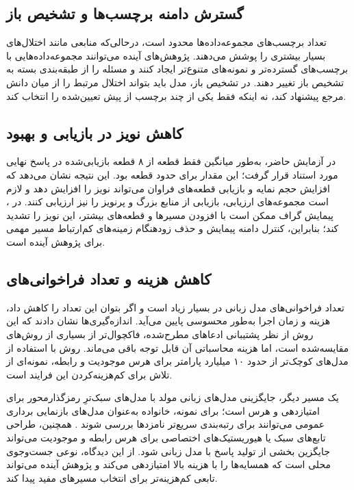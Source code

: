 \subsection{گسترش دامنه برچسب‌ها و تشخیص باز}

تعداد برچسب‌های مجموعه‌داده‌ها محدود است، درحالی‌که منابعی مانند  اختلال‌های بسیار بیشتری را پوشش می‌دهند. پژوهش‌های آینده می‌توانند مجموعه‌داده‌هایی با برچسب‌های گسترده‌تر و نمونه‌های متنوع‌تر ایجاد کنند و مسئله را از طبقه‌بندی بسته به تشخیص باز تغییر دهند. در تشخیص باز، مدل باید بتواند اختلال مرتبط را از میان دانش مرجع پیشنهاد کند، نه اینکه فقط یکی از چند برچسب از پیش تعیین‌شده را انتخاب کند.

\subsection{کاهش نویز در بازیابی و بهبود }

در آزمایش حاضر، به‌طور میانگین فقط  قطعه از ۸ قطعه بازیابی‌شده در پاسخ نهایی  مورد استناد قرار گرفت؛ این مقدار برای  حدود  قطعه بود. این نتیجه نشان می‌دهد که افزایش حجم نمایه و بازیابی قطعه‌های فراوان می‌تواند نویز را افزایش دهد و لازم است مجموعه‌های ارزیابی، بازیابی از منابع بزرگ و پرنویز را نیز ارزیابی کنند. در ، پیمایش گراف ممکن است با افزودن مسیرها و قطعه‌های بیشتر، این نویز را تشدید کند؛ بنابراین، کنترل دامنه پیمایش و حذف زودهنگام زمینه‌های کم‌ارتباط مسیر مهمی برای پژوهش آینده است.

\subsection{کاهش هزینه و تعداد فراخوانی‌های }

تعداد فراخوانی‌های مدل زبانی در  بسیار زیاد است و اگر بتوان این تعداد را کاهش داد، هزینه و زمان اجرا به‌طور محسوسی پایین می‌آید. اندازه‌گیری‌ها نشان دادند که این روش از نظر پشتیبانی ادعاهای مطرح‌شده، فاکچوال‌تر از بسیاری از روش‌های مقایسه‌شده است، اما هزینه محاسباتی آن قابل توجه باقی می‌ماند. روش  با استفاده از مدل‌های کوچک‌تر از حدود ۱۰ میلیارد پارامتر برای هرس موجودیت و رابطه، نمونه‌ای از تلاش برای کم‌هزینه‌کردن این فرایند است.

یک مسیر دیگر، جایگزینی مدل‌های زبانی مولد با مدل‌های سبک‌ترِ رمزگذارمحور برای امتیازدهی و هرس است؛ برای نمونه، خانواده  به‌عنوان مدل‌های بازنمایی برداری عمومی می‌توانند برای رتبه‌بندی سریع‌تر نامزدها بررسی شوند \cite{lee2025nvembed}. همچنین، طراحی تابع‌های سبک یا هیوریستیک‌های اختصاصی برای هرس رابطه و موجودیت می‌تواند جایگزین بخشی از تولید پاسخ با مدل زبانی شود. از این دیدگاه،  نوعی جست‌وجوی محلی است که همسایه‌ها را با هزینه بالا امتیازدهی می‌کند و پژوهش آینده می‌تواند تابعی کم‌هزینه‌تر برای انتخاب مسیرهای مفید پیدا کند.

